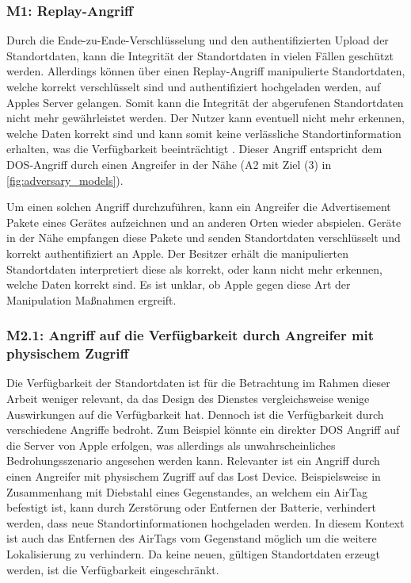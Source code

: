 \subsubsection[M1]{M1: Replay-Angriff}
\label{missbrauch:1}
Durch die Ende-zu-Ende-Verschlüsselung und den authentifizierten Upload der Standortdaten, kann die Integrität der Standortdaten in vielen Fällen geschützt werden.
Allerdings können über einen Replay-Angriff manipulierte Standortdaten, welche korrekt verschlüsselt sind und authentifiziert hochgeladen werden, auf Apples Server gelangen.
Somit kann die Integrität der abgerufenen Standortdaten nicht mehr gewährleistet werden.
Der Nutzer kann eventuell nicht mehr erkennen, welche Daten korrekt sind und kann somit keine verlässliche Standortinformation erhalten, was die Verfügbarkeit beeinträchtigt \cite{Heinrich_FindMy}.
Dieser Angriff entspricht dem \ac{DOS}-Angriff durch einen Angreifer in der Nähe (A2 mit Ziel (3) in \autoref{fig:adversary_models}).

Um einen solchen Angriff durchzuführen, kann ein Angreifer die Advertisement Pakete eines Gerätes aufzeichnen und an anderen Orten wieder abspielen.
Geräte in der Nähe empfangen diese Pakete und senden Standortdaten verschlüsselt und korrekt authentifiziert an Apple.
Der Besitzer erhält die manipulierten Standortdaten interpretiert diese als korrekt, oder kann nicht mehr erkennen, welche Daten korrekt sind.
Es ist unklar, ob Apple gegen diese Art der Manipulation Maßnahmen ergreift.


\subsubsection[M2.1]{M2.1: Angriff auf die Verfügbarkeit durch Angreifer mit physischem Zugriff}
\label{missbrauch:2.1}
Die Verfügbarkeit der Standortdaten ist für die Betrachtung im Rahmen dieser Arbeit weniger relevant, da das Design des Dienstes vergleichsweise wenige Auswirkungen auf die Verfügbarkeit hat.
Dennoch ist die Verfügbarkeit durch verschiedene Angriffe bedroht.
Zum Beispiel könnte ein direkter \ac{DOS} Angriff auf die Server von Apple erfolgen, was allerdings als unwahrscheinliches Bedrohungsszenario angesehen werden kann.
Relevanter ist ein Angriff durch einen Angreifer mit physischem Zugriff auf das Lost Device.
Beispielsweise in Zusammenhang mit Diebstahl eines Gegenstandes, an welchem ein AirTag befestigt ist, kann durch Zerstörung oder Entfernen der Batterie, verhindert werden, dass neue Standortinformationen hochgeladen werden.
In diesem Kontext ist auch das Entfernen des AirTags vom Gegenstand möglich um die weitere Lokalisierung zu verhindern.
Da keine neuen, gültigen Standortdaten erzeugt werden, ist die Verfügbarkeit eingeschränkt.

